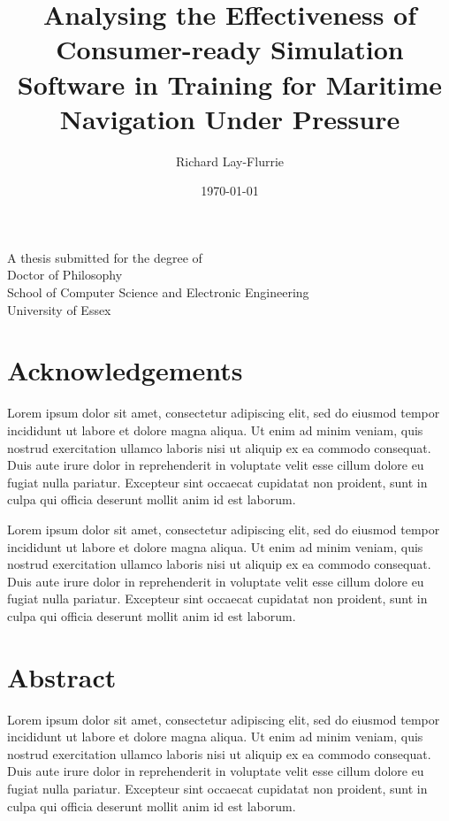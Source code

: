 \documentclass[12pt]{article}
\title{Analysing the Effectiveness of Consumer-ready Simulation Software in Training for Maritime Navigation Under Pressure}
\author{Richard Lay-Flurrie}
\date{\today}
\begin{document}
\maketitle
\thispagestyle{empty} %

\begin{center}
  \vfill
  \large
  A thesis submitted for the degree of\\
  Doctor of Philosophy\\
  \vfill
  \normalsize
  School of Computer Science and Electronic Engineering\\
  University of Essex\\
  \vfill
\end{center}

\newpage

\section*{Acknowledgements}

Lorem ipsum dolor sit amet, consectetur adipiscing elit, sed do eiusmod tempor incididunt ut labore et dolore magna aliqua. Ut enim ad minim veniam, quis nostrud exercitation ullamco laboris nisi ut aliquip ex ea commodo consequat. Duis aute irure dolor in reprehenderit in voluptate velit esse cillum dolore eu fugiat nulla pariatur. Excepteur sint occaecat cupidatat non proident, sunt in culpa qui officia deserunt mollit anim id est laborum.

Lorem ipsum dolor sit amet, consectetur adipiscing elit, sed do eiusmod tempor incididunt ut labore et dolore magna aliqua. Ut enim ad minim veniam, quis nostrud exercitation ullamco laboris nisi ut aliquip ex ea commodo consequat. Duis aute irure dolor in reprehenderit in voluptate velit esse cillum dolore eu fugiat nulla pariatur. Excepteur sint occaecat cupidatat non proident, sunt in culpa qui officia deserunt mollit anim id est laborum.

\newpage

\section*{Abstract}

Lorem ipsum dolor sit amet, consectetur adipiscing elit, sed do eiusmod tempor incididunt ut labore et dolore magna aliqua. Ut enim ad minim veniam, quis nostrud exercitation ullamco laboris nisi ut aliquip ex ea commodo consequat. Duis aute irure dolor in reprehenderit in voluptate velit esse cillum dolore eu fugiat nulla pariatur. Excepteur sint occaecat cupidatat non proident, sunt in culpa qui officia deserunt mollit anim id est laborum.
\end{document}
